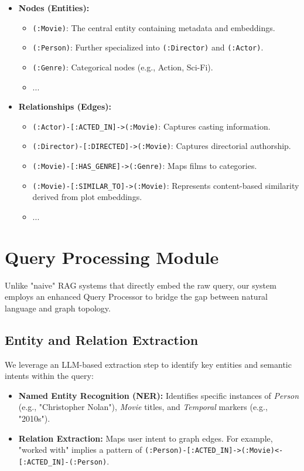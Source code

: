 \documentclass[a4paper, 12pt]{extreport}
\begin{document}
\begin{itemize}
    \item \textbf{Nodes (Entities):}
    \begin{itemize}
        \item \texttt{(:Movie)}: The central entity containing metadata and embeddings.
        \item \texttt{(:Person)}: Further specialized into \texttt{(:Director)} and \texttt{(:Actor)}.
        \item \texttt{(:Genre)}: Categorical nodes (e.g., Action, Sci-Fi).
        \item ...
    \end{itemize}
    
    \item \textbf{Relationships (Edges):}
    \begin{itemize}
        \item \texttt{(:Actor)-[:ACTED\_IN]->(:Movie)}: Captures casting information.
        \item \texttt{(:Director)-[:DIRECTED]->(:Movie)}: Captures directorial authorship.
        \item \texttt{(:Movie)-[:HAS\_GENRE]->(:Genre)}: Maps films to categories.
        \item \texttt{(:Movie)-[:SIMILAR\_TO]->(:Movie)}: Represents content-based similarity derived from plot embeddings.
        \item ...
    \end{itemize}
\end{itemize}

\section{Query Processing Module}
\label{sec:query_processing}

Unlike "naive" RAG systems that directly embed the raw query, our system employs an enhanced Query Processor to bridge the gap between natural language and graph topology.

\subsection{Entity and Relation Extraction}
We leverage an LLM-based extraction step to identify key entities and semantic intents within the query:
\begin{itemize}
    \item \textbf{Named Entity Recognition (NER):} Identifies specific instances of \textit{Person} (e.g., "Christopher Nolan"), \textit{Movie} titles, and \textit{Temporal} markers (e.g., "2010s").
    \item \textbf{Relation Extraction:} Maps user intent to graph edges. For example, "worked with" implies a pattern of \texttt{(:Person)-[:ACTED\_IN]->(:Movie)<-[:ACTED\_IN]-(:Person)}.
\end{itemize}
\end{document}
